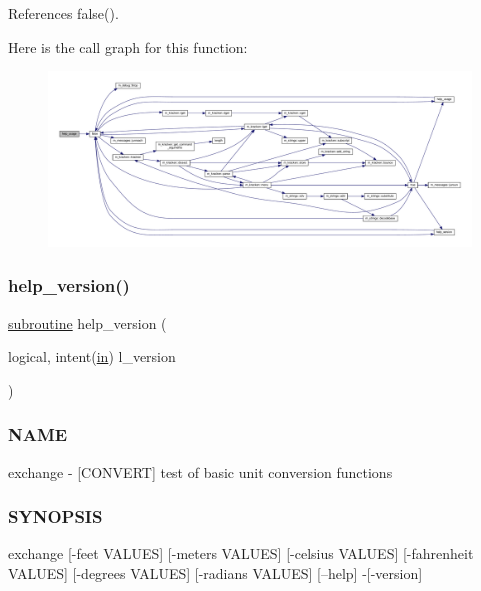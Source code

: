 References false().

Here is the call graph for this function\+:
\nopagebreak
\begin{figure}[H]
\begin{center}
\leavevmode
\includegraphics[width=350pt]{exchange_8f90_a3e09a3b52ee8fb04eeb93fe5761626a8_cgraph}
\end{center}
\end{figure}
\mbox{\label{exchange_8f90_a39c21619b08a3c22f19e2306efd7f766}} 
\subsubsection{\texorpdfstring{help\+\_\+version()}{help\_version()}}
{\footnotesize\ttfamily \hyperlink{M__stopwatch_83_8txt_acfbcff50169d691ff02d4a123ed70482}{subroutine} help\+\_\+version (\begin{DoxyParamCaption}\item[{logical, intent(\hyperlink{M__journal_83_8txt_afce72651d1eed785a2132bee863b2f38}{in})}]{l\+\_\+version }\end{DoxyParamCaption})}



\subsubsection*{N\+A\+ME}

exchange -\/ \mbox{[}C\+O\+N\+V\+E\+RT\mbox{]} test of basic unit conversion functions 

\subsubsection*{S\+Y\+N\+O\+P\+S\+IS}

\begin{DoxyVerb} exchange [-feet VALUES] [-meters VALUES]
          [-celsius VALUES] [-fahrenheit VALUES]
          [-degrees VALUES] [-radians VALUES]
          [--help] -[-version]
\end{DoxyVerb}


